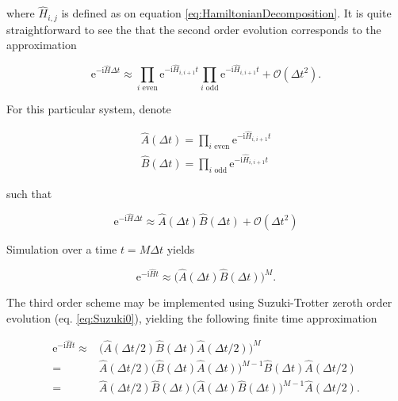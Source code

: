   \noindent where $\hat{H}_{i,j}$ is defined as on equation \ref{eq:HamiltonianDecomposition}. It is quite straightforward to see the that the second order evolution corresponds to the approximation

  \begin{equation}
    \mathrm{e}^{-\mathrm{i}\hat{H}\Delta t} \approx \prod_{i \text{ even}} \mathrm{e}^{-\mathrm{i}\hat{H}_{i,i+1}t} \prod_{i \text{ odd}} \mathrm{e}^{-\mathrm{i}\hat{H}_{i,i+1}t} + \mathcal{O}(\Delta t^2).
    \label{eq:HamiltonianTrotterization}
  \end{equation}

  For this particular system, denote

  \begin{gather}
    \hat{A}(\Delta t) = \prod_{i \text{ even}} \mathrm{e}^{-\mathrm{i}\hat{H}_{i,i+1}t} \\
    \hat{B}(\Delta t) = \prod_{i \text{ odd}} \mathrm{e}^{-\mathrm{i}\hat{H}_{i,i+1}t}
    \label{eq:ChainOpsTrotter}
  \end{gather}

  \noindent such that

  \begin{equation}
    \mathrm{e}^{-\mathrm{i}\hat{H}\Delta t} \approx \hat{A}(\Delta t) \hat{B}(\Delta t) + \mathcal{O}(\Delta t^2)
    \label{eq:HamiltonianTrotterization}
  \end{equation}

  Simulation over a time $t = M \Delta t$ yields

  \begin{equation}
    \mathrm{e}^{-\mathrm{i}\hat{H}t} \approx \bigg( \hat{A}(\Delta t) \hat{B}(\Delta t) \bigg)^{M}.
    \label{eq:HamiltonianTrotterization}
  \end{equation}

  The third order scheme may be implemented using Suzuki-Trotter zeroth order evolution (eq. \ref{eq:Suzuki0}), yielding the following finite time approximation

  \begin{equation}
    \begin{aligned}
      \mathrm{e}^{-\mathrm{i}\hat{H}t} \approx & \bigg( \hat{A}(\Delta t/2) \hat{B}(\Delta t) \hat{A}(\Delta t/2) \bigg)^{M} \\
    = &  \hat{A}(\Delta t/2) \bigg( \hat{B}(\Delta t) \hat{A}(\Delta t) \bigg)^{M-1} \hat{B}(\Delta t) \hat{A}(\Delta t/2) \\
    = & \hat{A}(\Delta t/2) \hat{B}(\Delta t) \bigg( \hat{A}(\Delta t) \hat{B}(\Delta t) \bigg)^{M-1} \hat{A}(\Delta t/2).
    \label{eq:HamiltonianTrotterization}
    \end{aligned}
  \end{equation}

